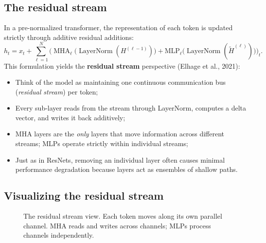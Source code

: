 \documentclass[11pt,a4paper]{article}
\DeclareMathOperator{\LN}{LayerNorm}
\DeclareMathOperator{\MHA}{MHA}
\newcommand{\slides}[1]{\par\nopagebreak\noindent{\normalfont\small\emph{(slides #1)}}\par\nopagebreak\vspace{2pt}}
\theoremstyle{definition}
\theoremstyle{plain}
\begin{document}
\subsection{The residual stream}\slides{63 / 84}
In a pre-normalized transformer, the representation of each token is updated strictly through additive residual additions:
\begin{equation}\label{eq:residual_stream}
h_t = x_t + \sum_{\ell=1}^N \Big( \MHA_\ell\big(\LN(H^{(\ell-1)})\big) + \mathrm{MLP}_\ell\big(\LN(\tilde{H}^{(\ell)})\big) \Big)_t.
\end{equation}
This formulation yields the \textbf{residual stream} perspective (Elhage et al., 2021):
\begin{itemize}[nosep]
\item Think of the model as maintaining one continuous communication bus (\emph{residual stream}) per token;
\item Every sub-layer reads from the stream through LayerNorm, computes a delta vector, and writes it back additively;
\item MHA layers are the \emph{only} layers that move information across different streams; MLPs operate strictly within individual streams;
\item Just as in ResNets, removing an individual layer often causes minimal performance degradation because layers act as ensembles of shallow paths.
\end{itemize}

\subsection{Visualizing the residual stream}\slides{64 / 84}
\begin{figure}[H]
\centering
{}
\caption{The residual stream view. Each token moves along its own parallel channel. MHA reads and writes across channels; MLPs process channels independently.}\label{fig:residual_stream_vis}
\end{figure}
\end{document}
